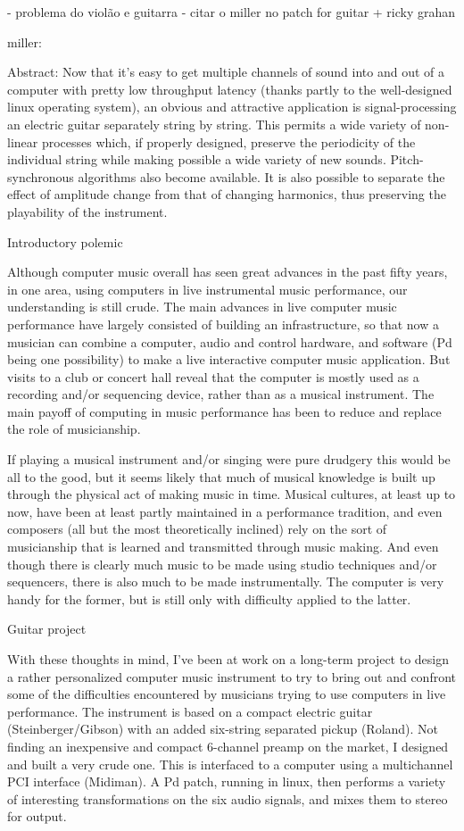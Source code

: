 \documentclass{ppgmus}
\begin{document}
- problema do violão e guitarra - citar o miller no patch for guitar + ricky grahan

miller:


Abstract:
Now that it's easy to get multiple channels of sound into and out of a computer with pretty low 
throughput latency (thanks partly to the well-designed linux operating system), an obvious and 
attractive application is signal-processing an electric guitar separately string by string. 
This permits a wide variety of non-linear processes which, if properly designed, preserve the 
periodicity of the individual string while making possible a wide variety of new sounds. 
Pitch-synchronous algorithms also become available. It is also possible to separate the effect 
of amplitude change from that of changing harmonics, thus preserving the playability of the instrument.

Introductory polemic

Although computer music overall has seen great advances in the past fifty years, in one area, 
using computers in live instrumental music performance, our understanding is still crude. 
The main advances in live computer music performance have largely consisted of building an 
infrastructure, so that now a musician can combine a computer, audio and control hardware, 
and software (Pd being one possibility) to make a live interactive computer music application. 
But visits to a club or concert hall reveal that the computer is mostly used as a recording and/or 
sequencing device, rather than as a musical instrument. The main payoff of computing in music 
performance has been to reduce and replace the role of musicianship.

If playing a musical instrument and/or singing were pure drudgery this would be all to the good, 
but it seems likely that much of musical knowledge is built up through the physical act of 
making music in time. Musical cultures, at least up to now, have been at least partly maintained in 
a performance tradition, and even composers (all but the most theoretically inclined) rely on the sort 
of musicianship that is learned and transmitted through music making. And even though there is clearly 
much music to be made using studio techniques and/or sequencers, there is also much to be made 
instrumentally. The computer is very handy for the former, but is still only with difficulty applied to 
the latter.

Guitar project

With these thoughts in mind, I've been at work on a long-term project to design a rather personalized 
computer music instrument to try to bring out and confront some of the difficulties encountered by 
musicians trying to use computers in live performance. The instrument is based on a compact electric 
guitar (Steinberger/Gibson) with an added six-string separated pickup (Roland). Not finding an 
inexpensive and compact 6-channel preamp on the market, I designed and built a very crude one. 
This is interfaced to a computer using a multichannel PCI interface (Midiman). A Pd patch, running in 
linux, then performs a variety of interesting transformations on the six audio signals, and mixes them 
to stereo for output.
\end{document}
